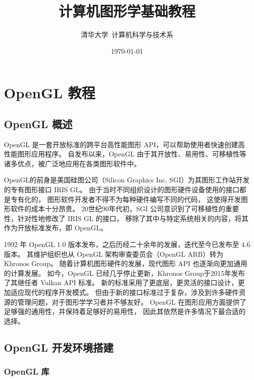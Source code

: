\documentclass[fontset=windows]{ctexart}
\title{\bf\huge 计算机图形学基础教程}
\author{清华大学\ 计算机科学与技术系}
\date{\today}
\begin{document}
\maketitle


\tableofcontents

\newpage

\section{OpenGL 教程}

\subsection{OpenGL 概述}

\emph{}

OpenGL 是一套开放标准的跨平台高性能图形 API，可以帮助使用者快速创建高性能图形应用程序。
自发布以来，OpenGL 由于其开放性、易用性、可移植性等诸多优点，被广泛地应用在各类图形软件中。

OpenGL的前身是美国硅图公司（Silicon Graphics Inc, SGI）为其图形工作站开发的专有图形接口 IRIS GL。
由于当时不同组织设计的图形硬件设备使用的接口都是专有化的，
图形软件开发者不得不为每种硬件编写不同的代码，
这使得开发图形软件的成本十分昂贵。
20世纪90年代初，SGI 公司意识到了可移植性的重要性，针对性地修改了 IRIS GL 的接口，
移除了其中与特定系统相关的内容，将其作为开放标准发布，即 OpenGL。

1992 年 OpenGL 1.0 版本发布，之后历经二十余年的发展，迭代至今已发布至 4.6 版本。
其维护组织也从 OpenGL 架构审查委员会（OpenGL ARB）转为 Khronos Group。
随着计算机图形硬件的发展，现代图形 API 也逐渐向更加通用的计算发展。
如今，OpenGL 已经几乎停止更新，Khronos Group于2015年发布了其继任者 Vulkan API 标准。
新的标准采用了更底层，更灵活的接口设计，更加适应现代的程序开发模式。
但由于新的接口标准过于复杂，涉及到许多硬件资源的管理问题，对于图形学学习者并不够友好。
OpenGL 在图形应用方面提供了足够强的通用性，并保持着足够好的易用性，
因此其依然是许多情况下最合适的选择。

\subsection{OpenGL 开发环境搭建}

\subsubsection{OpenGL 库}
\end{document}
